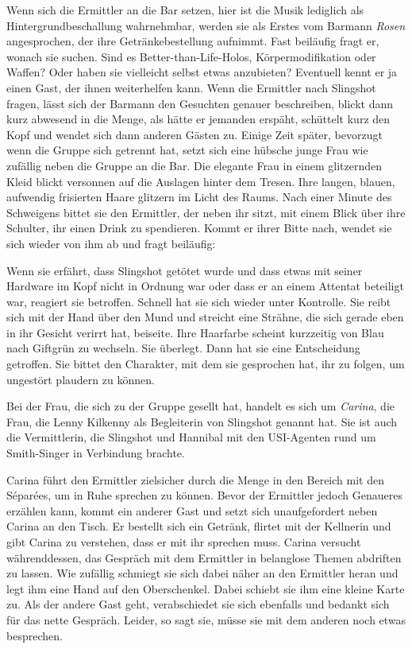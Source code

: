 Wenn sich die Ermittler an die Bar setzen, hier ist die Musik lediglich als Hintergrundbeschallung wahrnehmbar, werden sie als Erstes vom Barmann \emph{Rosen} angesprochen, der ihre Getränkebestellung aufnimmt. Fast beiläufig fragt er, wonach sie suchen. Sind es Better-than-Life-Holos, Körpermodifikation oder Waffen? Oder haben sie vielleicht selbst etwas anzubieten? Eventuell kennt er ja einen Gast, der ihnen weiterhelfen kann. Wenn die Ermittler nach Slingshot fragen, lässt sich der Barmann den Gesuchten genauer beschreiben, blickt dann kurz abwesend in die Menge, als hätte er jemanden erspäht, schüttelt kurz den Kopf und wendet sich dann anderen Gästen zu. Einige Zeit später, bevorzugt wenn die Gruppe sich getrennt hat, setzt sich eine hübsche junge Frau wie zufällig neben die Gruppe an die Bar. Die elegante Frau in einem glitzernden Kleid blickt versonnen auf die Auslagen hinter dem Tresen. Ihre langen, blauen, aufwendig frisierten Haare glitzern im Licht des Raums. Nach einer Minute des Schweigens bittet sie den Ermittler, der neben ihr sitzt, mit einem Blick über ihre Schulter, ihr einen Drink zu spendieren. Kommt er ihrer Bitte nach, wendet sie sich wieder von ihm ab und fragt beiläufig:


Wenn sie erfährt, dass Slingshot getötet wurde und dass etwas mit seiner Hardware im Kopf nicht in Ordnung war oder dass er an einem Attentat beteiligt war, reagiert sie betroffen. Schnell hat sie sich wieder unter Kontrolle. Sie reibt sich mit der Hand über den Mund und streicht eine Strähne, die sich gerade eben in ihr Gesicht verirrt hat, beiseite. Ihre Haarfarbe scheint kurzzeitig von Blau nach Giftgrün zu wechseln. Sie überlegt. Dann hat sie eine Entscheidung getroffen. Sie bittet den Charakter, mit dem sie gesprochen hat, ihr zu folgen, um ungestört plaudern zu können.

Bei der Frau, die sich zu der Gruppe gesellt hat, handelt es sich um \emph{Carina}, die Frau, die Lenny Kilkenny als Begleiterin von Slingshot genannt hat. Sie ist auch die Vermittlerin, die Slingshot und Hannibal mit den USI-Agenten rund um Smith-Singer in Verbindung brachte.

Carina führt den Ermittler zielsicher durch die Menge in den Bereich mit den Séparées, um in Ruhe sprechen zu können. Bevor der Ermittler jedoch Genaueres erzählen kann, kommt ein anderer Gast und setzt sich unaufgefordert neben Carina an den Tisch. Er bestellt sich ein Getränk, flirtet mit der Kellnerin und gibt Carina zu verstehen, dass er mit ihr sprechen muss. Carina versucht währenddessen, das Gespräch mit dem Ermittler in belanglose Themen abdriften zu lassen. Wie zufällig schmiegt sie sich dabei näher an den Ermittler heran und legt ihm eine Hand auf den Oberschenkel. Dabei schiebt sie ihm eine kleine Karte zu. Als der andere Gast geht, verabschiedet sie sich ebenfalls und bedankt sich für das nette Gespräch. Leider, so sagt sie, müsse sie mit dem anderen noch etwas besprechen.

